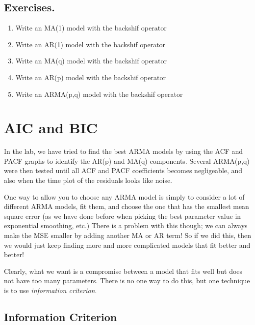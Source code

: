 \documentclass[a4paper,11pt,oneside,onecolumn]{book}
\begin{document}
\section{Exercises.}
\begin{enumerate}
\item  Write an MA(1) model with the backshif operator
\item  Write an AR(1) model with the backshif operator
\item  Write an MA(q) model with the backshif operator
\item  Write an AR(p) model with the backshif operator
\item Write an ARMA(p,q) model with the backshif operator



\end{enumerate}



\chapter{AIC and BIC}

\label{chp:AIC:BIC}


In the lab, we have tried to find the best ARMA models by using the ACF and PACF graphs to identify the AR(p) and MA(q) components.
Several ARMA(p,q) were then tested until all ACF and PACF coefficients becomes negligeable, and also when the time plot of the residuals looks like noise.

One way to allow you to choose any ARMA model is simply to consider
a lot of different ARMA models, fit them, and choose the one that
has the smallest mean square error (as we have done before when
picking the best parameter value in exponential smoothing, etc.)
There is a problem with this though; we can always make the MSE
smaller by adding another MA or AR term! So if we did this, then we
would just keep finding more and more complicated models that fit
better and better!

Clearly, what we want is a compromise between a model that fits well
but does not have too many parameters. There is no one way to do
this, but one technique is to use {\it information
criterion}.

\section{Information Criterion}
\end{document}

